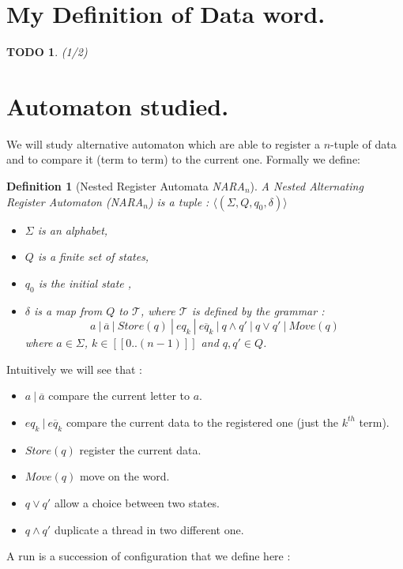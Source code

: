 \documentclass[a4paper,10pt]{report}
\newtheorem{df}{Definition}
\newtheorem{td}{TODO}
\newcommand{\seg}[1]{[\![#1]\!]}
\newcommand{\ts}{\seg{0 .. (n-1)}}
\begin{document}
\section{My Definition of Data word.}
\begin{td}
  (1/2)
\end{td}
\section{Automaton studied.}
We will study alternative automaton which are able to register a $n$-tuple of data and to compare it (term to term) to the current one.
Formally we define:
\begin{df}[Nested Register Automata \textit{NARA}$_n$]
  A Nested Alternating Register Automaton (\textit{NARA}$_n$) is a tuple : 
  $\langle (\Sigma ,Q ,q_0, \delta )  \rangle$
  \begin{itemize}
   \item $\Sigma$ is an alphabet,
   \item $Q$ is a finite set of states,
   \item $q_0$ is the initial state ,
   \item $ \delta $ is a map from $Q $ to $\mathcal{T} $, where $\mathcal{T}$ is defined by the grammar : 
   $$ a \ | \  \overline{a} \ | \ Store(q) \ | \ eq_k \ | \  \overline{eq_k} \ | \  q \wedge q' \ | \ q \vee q' \ | \ Move(q)  $$
  where $a \in \Sigma$, $k \in  \ts$ and $q,q' \in Q$.
  \end{itemize}
\end{df}

Intuitively we will see that :
\begin{itemize}
   \item $ a \ | \  \overline{a}$ compare the current letter to $a$.
   \item $eq_k \ | \  \overline{eq_k}$ compare the current data to the registered one (just the $k^{th}$ term).
   \item $Store(q)$ register the current data.
   \item $Move(q)$ move on the word.
   \item $q \vee q' $ allow a choice between two states.
   \item $q \wedge q'$  duplicate a thread in two different one. 
\end{itemize}


A run is a succession of configuration that we define here :
\end{document}
